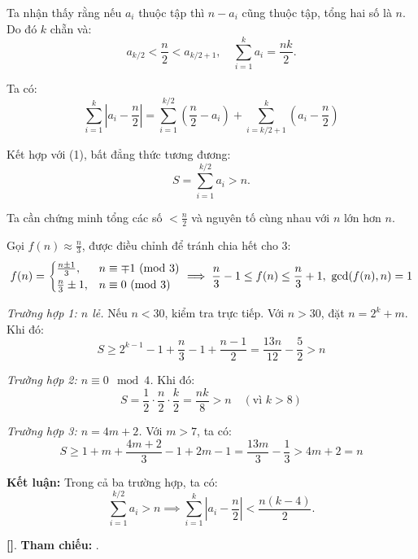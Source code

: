 \documentclass[../2015-n-s.tex]{subfiles}
\begin{document}
\begin{soln}

	Ta nhận thấy rằng nếu \( a_i \) thuộc tập thì \( n - a_i \) cũng thuộc tập, tổng hai số là \( n \). Do đó \( k \) chẵn và:
	\[
		a_{k/2} < \frac{n}{2} < a_{k/2+1}, \quad \sum_{i=1}^k a_i = \frac{nk}{2}. \tag{1}
	\]

	Ta có:
	\[
		\sum_{i=1}^{k} \left| a_i - \frac{n}{2} \right| = \sum_{i=1}^{k/2} \left(\frac{n}{2} - a_i\right) + \sum_{i=k/2+1}^{k} \left(a_i - \frac{n}{2}\right)
	\]

	Kết hợp với (1), bất đẳng thức tương đương:
	\[
		S = \sum_{i=1}^{k/2} a_i > n.
	\]

	Ta cần chứng minh tổng các số \( < \frac{n}{2} \) và nguyên tố cùng nhau với \( n \) lớn hơn \( n \).

	Gọi \( f(n) \approx \frac{n}{3} \), được điều chỉnh để tránh chia hết cho 3:
	\[
		f(n) = 
		\begin{cases}
			\frac{n \pm 1}{3}, & n \equiv \mp 1 \Mod{3} \\
			\frac{n}{3} \pm 1, & n \equiv 0 \Mod{3}
		\end{cases}
		\implies \frac{n}{3} - 1 \le f(n) \le \frac{n}{3} + 1,\ \gcd(f(n), n) = 1
	\]

	\textit{Trường hợp 1: \( n \) lẻ.} Nếu \( n < 30 \), kiểm tra trực tiếp. Với \( n > 30 \), đặt \( n = 2^k + m \). Khi đó:
	\[
		S \ge 2^{k-1} - 1 + \frac{n}{3} - 1 + \frac{n - 1}{2} = \frac{13n}{12} - \frac{5}{2} > n
	\]

	\textit{Trường hợp 2: \( n \equiv 0 \mod 4 \).} Khi đó:
	\[
		S = \frac{1}{2} \cdot \frac{n}{2} \cdot \frac{k}{2} = \frac{nk}{8} > n \quad (\text{vì } k > 8)
	\]

	\textit{Trường hợp 3: \( n = 4m + 2 \).} Với \( m > 7 \), ta có:
	\[
		S \ge 1 + m + \frac{4m + 2}{3} - 1 + 2m - 1 = \frac{13m}{3} - \frac{1}{3} > 4m + 2 = n
	\]

	\textbf{Kết luận:} Trong cả ba trường hợp, ta có:
	\[
		\sum_{i=1}^{k/2} a_i > n \implies \sum_{i=1}^k \left| a_i - \frac{n}{2} \right| < \frac{n(k - 4)}{2}.
	\]

	\vspace{1em}
	\textbf{[]}.
	\textbf{Tham chiếu:} .
\end{soln}

\end{document}
